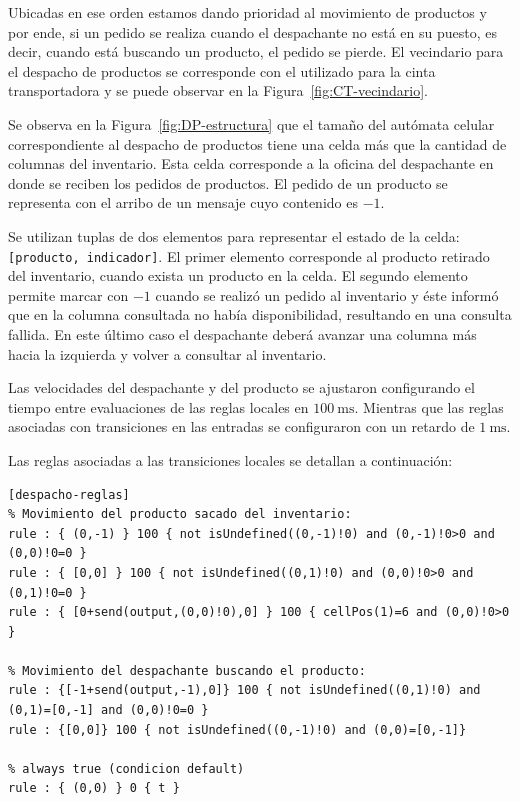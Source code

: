 \documentclass[10pt]{article}
\begin{document}
Ubicadas en ese orden estamos dando prioridad al movimiento de productos y por ende, si un pedido se realiza cuando el despachante no está en su puesto, es decir, cuando está buscando un producto, el pedido se pierde. El vecindario para el despacho de productos se corresponde con el utilizado para la cinta transportadora y se puede observar en la Figura~\ref{fig:CT-vecindario}. 

Se observa en la Figura~\ref{fig:DP-estructura} que el tamaño del autómata celular correspondiente al despacho de productos tiene una celda más que la cantidad de columnas del inventario. Esta celda corresponde a la oficina del despachante en donde se reciben los pedidos de productos. El pedido de un producto se representa con el arribo de un mensaje cuyo contenido es $-1$.

Se utilizan tuplas de dos elementos para representar el estado de la celda: \texttt{[producto, indicador]}. El primer elemento corresponde al producto retirado del inventario, cuando exista un producto en la celda. El segundo elemento permite marcar con $-1$ cuando se realizó un pedido al inventario y éste informó que en la columna consultada no había disponibilidad, resultando en una consulta fallida. En este último caso el despachante deberá avanzar una columna más hacia la izquierda y volver a consultar al inventario.

Las velocidades del despachante y del producto se ajustaron configurando el tiempo entre evaluaciones de las reglas locales en $100~\textrm{ms}$. Mientras que las reglas asociadas con transiciones en las entradas se configuraron con un retardo de $1~\textrm{ms}$.

Las reglas asociadas a las transiciones locales se detallan a continuación:

\begin{minipage}{1\textwidth}
	\centering
	\begin{lstlisting}
[despacho-reglas]
% Movimiento del producto sacado del inventario:
rule : { (0,-1) } 100 { not isUndefined((0,-1)!0) and (0,-1)!0>0 and (0,0)!0=0 }
rule : { [0,0] } 100 { not isUndefined((0,1)!0) and (0,0)!0>0 and (0,1)!0=0 }
rule : { [0+send(output,(0,0)!0),0] } 100 { cellPos(1)=6 and (0,0)!0>0 }

% Movimiento del despachante buscando el producto:
rule : {[-1+send(output,-1),0]} 100 { not isUndefined((0,1)!0) and (0,1)=[0,-1] and (0,0)!0=0 }
rule : {[0,0]} 100 { not isUndefined((0,-1)!0) and (0,0)=[0,-1]}

% always true (condicion default)
rule : { (0,0) } 0 { t }
	\end{lstlisting}
\end{minipage}
\end{document}
